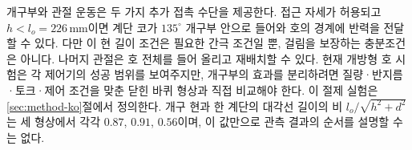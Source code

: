 개구부와 관절 운동은 두 가지 추가 접촉 수단을 제공한다. 접근 자세가 허용되고
$h<l_o=226\,$mm이면 계단 코가 $135^\circ$ 개구부 안으로 들어와 호의 경계에
반력을 전달할 수 있다. 다만 이 현 길이 조건은 필요한 간극 조건일 뿐, 걸림을
보장하는 충분조건은 아니다. 나머지 관절은 호 전체를 들어 올리고 재배치할 수
있다. 현재 개방형 호 시험은 각 제어기의 성공 범위를 보여주지만, 개구부의 효과를
분리하려면 질량·반지름·토크·제어 조건을 맞춘 닫힌 바퀴 형상과 직접 비교해야
한다. 이 절제 실험은 \ref{sec:method-ko}절에서 정의한다. 개구 현과 한 계단의
대각선 길이의 비 $l_o/\sqrt{h^2+d^2}$는 세 형상에서 각각 $0.87$, $0.91$,
$0.56$이며, 이 값만으로 관측 결과의 순서를 설명할 수는 없다.
